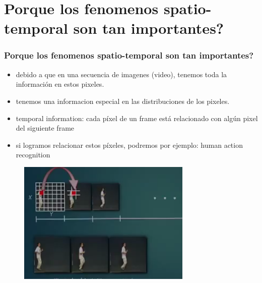 \documentclass{beamer}
\begin{document}
\section{Porque los fenomenos spatio-temporal son tan importantes?
}

\begin{frame}	
\frametitle{Porque los fenomenos spatio-temporal son tan importantes?
}

\begin{itemize}
\item debido a que en una secuencia de imagenes (video), tenemos toda la información en estos pixeles.
\item tenemos una informacion especial en las distribuciones de los pixeles.
\item temporal information: cada píxel de un frame está relacionado con algún pixel del siguiente frame
\item si logramos relacionar estos píxeles, podremos por ejemplo: human action recognition
 
\end{itemize}
\begin{figure}
\includegraphics[width=0.4\linewidth]{img2/Selection_017.png}
\end{figure}

\end{frame}
\end{document}
